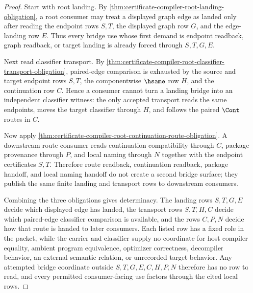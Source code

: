\begin{proof}
Start with root landing. By \autoref{thm:certificate-compiler-root-landing-obligation}, a root consumer may treat a displayed graph edge as landed only after reading the endpoint rows $S,T$, the displayed graph row $G$, and the edge-landing row $E$. Thus every bridge use whose first demand is endpoint readback, graph readback, or target landing is already forced through $S,T,G,E$.

Next read classifier transport. By \autoref{thm:certificate-compiler-root-classifier-transport-obligation}, paired-edge comparison is exhausted by the source and target endpoint rows $S,T$, the componentwise $\hsame$ row $H$, and the continuation row $C$. Hence a consumer cannot turn a landing bridge into an independent classifier witness: the only accepted transport reads the same endpoints, moves the target classifier through $H$, and follows the paired $\Cont$ routes in $C$.

Now apply \autoref{thm:certificate-compiler-root-continuation-route-obligation}. A downstream route consumer reads continuation compatibility through $C$, package provenance through $P$, and local naming through $N$ together with the endpoint certificates $S,T$. Therefore route readback, continuation readback, package handoff, and local naming handoff do not create a second bridge surface; they publish the same finite landing and transport rows to downstream consumers.

Combining the three obligations gives determinacy. The landing rows $S,T,G,E$ decide which displayed edge has landed, the transport rows $S,T,H,C$ decide which paired-edge classifier comparison is available, and the rows $C,P,N$ decide how that route is handed to later consumers. Each listed row has a fixed role in the packet, while the carrier and classifier supply no coordinate for host compiler equality, ambient program equivalence, optimizer correctness, decompiler behavior, an external semantic relation, or unrecorded target behavior. Any attempted bridge coordinate outside $S,T,G,E,C,H,P,N$ therefore has no row to read, and every permitted consumer-facing use factors through the cited local rows.
\end{proof}

